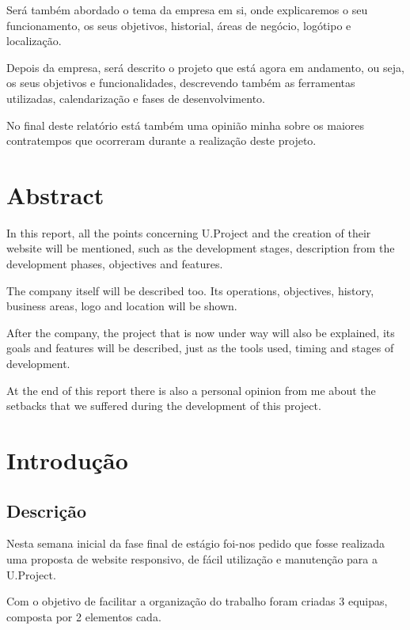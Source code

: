 \documentclass[11pt]{report}
\begin{document}
Será também abordado o tema da empresa em si, onde explicaremos o seu funcionamento, os seus objetivos, historial, áreas de negócio, logótipo e localização.

Depois da empresa, será descrito o projeto que está agora em andamento, ou seja, os seus objetivos e funcionalidades, descrevendo também as ferramentas utilizadas, calendarização e fases de desenvolvimento.

 No final deste relatório está também uma opinião minha sobre os maiores contratempos que ocorreram durante a realização deste projeto.
\newpage

\chapter*{Abstract}
In this report, all the points concerning U.Project and the creation of their website will be mentioned, such as the development stages, description from the development phases, objectives and features. 


The company itself will be described too. Its operations, objectives, history, business areas, logo and location will be shown.


After the company, the project that is now under way will also be explained, its goals and features will be described, just as the tools used, timing and stages of development. 


At the end of this report there is also a personal opinion from me about the setbacks that we suffered during the development of this project.
\tableofcontents

\newpage


\newpage

\chapter{Introdução}

\section{Descrição}
Nesta semana inicial da fase final de estágio foi-nos pedido que fosse realizada uma proposta de website responsivo, de fácil utilização e manutenção para a U.Project.

Com o objetivo de facilitar a organização do trabalho foram criadas 3 equipas, composta por 2 elementos cada.
\end{document}
